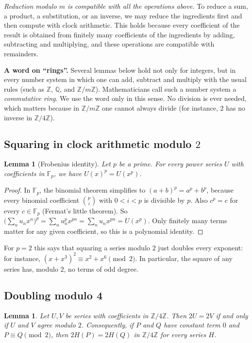 \documentclass[11pt,a4paper]{article}
\newtheorem{lemma}[theorem]{Lemma}
\theoremstyle{definition}
\theoremstyle{remark}
\newcommand{\Z}{\mathbb{Z}}
\newcommand{\Q}{\mathbb{Q}}
\newcommand{\F}{\mathbb{F}}
\newcommand{\para}[1]{\par\medskip\noindent\textbf{#1}\enspace}
\begin{document}
\emph{Reduction modulo $m$ is compatible with all the operations above.} To reduce a sum, a product, a substitution, or
an inverse, we may reduce the ingredients first and then compute with clock arithmetic. This holds because every
coefficient of the result is obtained from finitely many coefficients of the ingredients by adding, subtracting and
multiplying, and these operations are compatible with remainders.

\para{A word on ``rings''.} Several lemmas below hold not only for integers, but in every number system in
which one can add, subtract and multiply with the usual rules (such as $\Z$, $\Q$, and $\Z/m\Z$). Mathematicians call
such a number system a \emph{commutative ring}. We use the word only in this sense. No division is ever needed, which
matters because in $\Z/m\Z$ one cannot always divide (for instance, $2$ has no inverse in $\Z/4\Z$).

\subsection{Squaring in clock arithmetic modulo \texorpdfstring{$2$}{2}}
\begin{lemma}[Frobenius identity]\label{lem:frobenius}
Let $p$ be a prime. For every power series $U$ with coefficients in $\F_p$, we have $U(x)^p=U(x^p)$.
\end{lemma}

\begin{proof}
In $\F_p$, the binomial theorem simplifies to $(a+b)^p=a^p+b^p$, because every binomial coefficient
$\binom pi$ with $0<i<p$ is divisible by $p$. Also $c^p=c$ for every $c\in\F_p$ (Fermat's little theorem). So
$\bigl(\sum_nu_nx^n\bigr)^p=\sum_nu_n^px^{pn}=\sum_nu_nx^{pn}=U(x^p)$. Only finitely many terms matter for any given
coefficient, so this is a polynomial identity.
\end{proof}

For $p=2$ this says that squaring a series modulo $2$ just doubles every exponent: for instance,
$(x+x^3)^2\equiv x^2+x^6\pmod2$. In particular, the square of any series has, modulo $2$, no terms of odd degree.

\subsection{Doubling modulo 4}
\begin{lemma}\label{lem:double}
Let $U,V$ be series with coefficients in $\Z/4\Z$. Then $2U=2V$ if and only if $U$ and $V$ agree modulo $2$.
Consequently, if $P$ and $Q$ have constant term $0$ and $P\equiv Q\pmod 2$, then $2H(P)=2H(Q)$ in $\Z/4\Z$ for every
series $H$.
\end{lemma}
\end{document}
